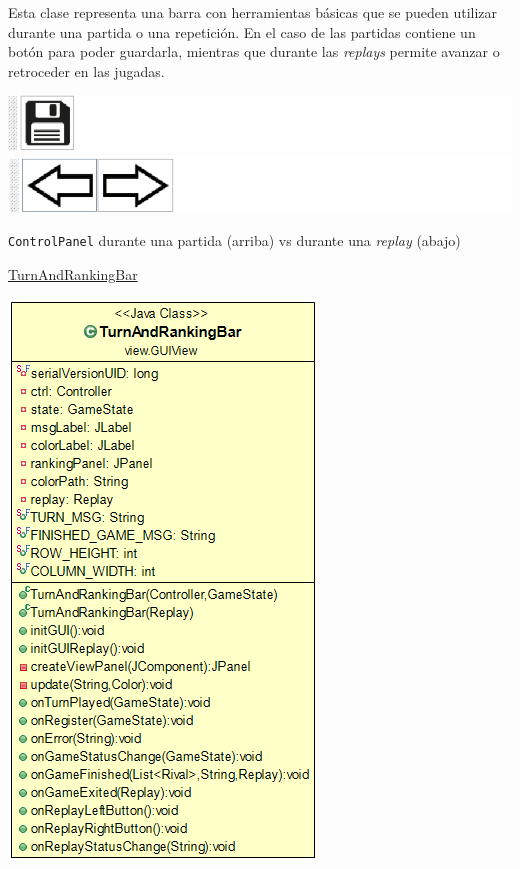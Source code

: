 \documentclass[12pt,a4paper,openright]{book}
\theoremstyle{break}
\begin{document}
Esta clase representa una barra con herramientas básicas que se pueden utilizar durante una partida o una repetición. En el caso de las partidas contiene un botón para poder guardarla, mientras que durante las \textit{replays} permite avanzar o retroceder en las jugadas.
\begin{center}
\includegraphics[scale=0.65]{controlpanel-partida.png}
\includegraphics[scale=0.65]{controlpanel-replay.png}

\texttt{ControlPanel} durante una partida (arriba) vs durante una \textit{replay} (abajo)
\end{center}

\newpage

\underline{TurnAndRankingBar}
\begin{center}
\includegraphics[scale=0.60]{turnranking-uml.png}
\end{center}
\end{document}
